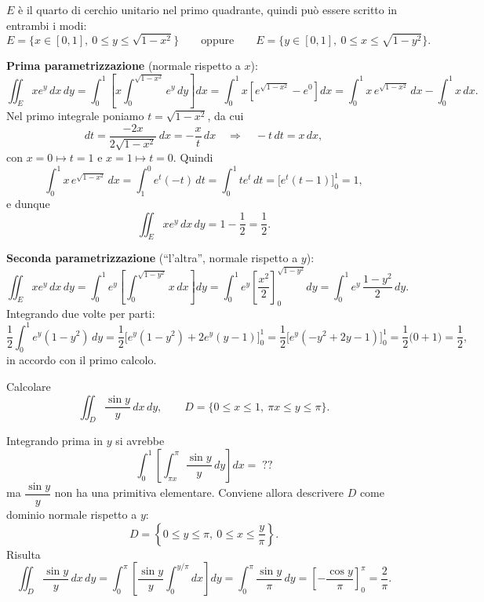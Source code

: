 \begin{solution}
    $E$ è il quarto di cerchio unitario nel primo quadrante, quindi può essere scritto in entrambi i modi:
    \[
        E = \{ x \in [0,1],\ 0 \le y \le \sqrt{1 - x^2} \}
        \qquad \text{oppure} \qquad
        E = \{ y \in [0,1],\ 0 \le x \le \sqrt{1 - y^2} \}.
    \]

    \medskip
    \textbf{Prima parametrizzazione} (normale rispetto a $x$):
    \[
        \iint_E x e^y \,dx\,dy
        = \int_0^1 \left[ x \int_0^{\sqrt{1-x^2}} e^y \,dy \right] dx
        = \int_0^1 x \left[ e^{\sqrt{1-x^2}} - e^0 \right] dx
        = \int_0^1 x\, e^{\sqrt{1-x^2}} \,dx - \int_0^1 x \,dx .
    \]
    Nel primo integrale poniamo $t = \sqrt{1-x^2}$, da cui
    \[
        dt = \frac{-2x}{2\sqrt{1-x^2}} \,dx = -\frac{x}{t} \,dx
        \quad \Longrightarrow \quad -t \,dt = x \,dx,
    \]
    con $x = 0 \mapsto t = 1$ e $x = 1 \mapsto t = 0$. Quindi
    \[
        \int_0^1 x\, e^{\sqrt{1-x^2}} \,dx = \int_1^0 e^t (-t) \,dt = \int_0^1 t e^t \,dt
        = \Big[ e^t (t - 1) \Big]_0^1 = 1,
    \]
    e dunque
    \[
        \iint_E x e^y \,dx\,dy = 1 - \frac{1}{2} = \frac{1}{2}.
    \]

    \medskip
    \textbf{Seconda parametrizzazione} (``l'altra'', normale rispetto a $y$):
    \[
        \iint_E x e^y \,dx\,dy
        = \int_0^1 e^y \left[ \int_0^{\sqrt{1-y^2}} x \,dx \right] dy
        = \int_0^1 e^y \left[ \frac{x^2}{2} \right]_0^{\sqrt{1-y^2}} dy
        = \int_0^1 e^y \, \frac{1 - y^2}{2} \,dy .
    \]
    Integrando due volte per parti:
    \[
        \frac{1}{2} \int_0^1 e^y (1 - y^2) \,dy
        = \frac{1}{2} \Big[ e^y (1 - y^2) + 2 e^y (y - 1) \Big]_0^1
        = \frac{1}{2} \Big[ e^y (-y^2 + 2y - 1) \Big]_0^1
        = \frac{1}{2} \big( 0 + 1 \big) = \frac{1}{2},
    \]
    in accordo con il primo calcolo.
\end{solution}

\begin{esercizio}
    Calcolare
    \[
        \iint_D \frac{\sin y}{y} \,dx\,dy, \qquad D = \{ 0 \le x \le 1,\ \pi x \le y \le \pi \}.
    \]
\end{esercizio}

\begin{solution}
    Integrando prima in $y$ si avrebbe
    \[
        \int_0^1 \left[ \int_{\pi x}^{\pi} \frac{\sin y}{y} \,dy \right] dx = \; ??
    \]
    ma $\dfrac{\sin y}{y}$ non ha una primitiva elementare. Conviene allora descrivere $D$ come dominio normale rispetto a $y$:
    \[
        D = \left\{ 0 \le y \le \pi,\ 0 \le x \le \frac{y}{\pi} \right\}.
    \]
    Risulta
    \[
        \iint_D \frac{\sin y}{y} \,dx\,dy
        = \int_0^{\pi} \left[ \frac{\sin y}{y} \int_0^{y/\pi} dx \right] dy
        = \int_0^{\pi} \frac{\sin y}{\pi} \,dy
        = \left[ -\frac{\cos y}{\pi} \right]_0^{\pi}
        = \frac{2}{\pi} .
    \]
\end{solution}
